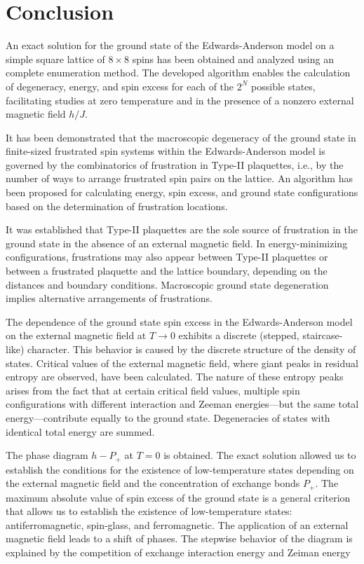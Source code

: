 \documentclass[preprint,12pt]{elsarticle}
\begin{document}
	\section{Conclusion}
	
	An exact solution for the ground state of the Edwards-Anderson model on a simple square lattice of $8 \times 8$ spins has been obtained and analyzed using an complete enumeration method. The developed algorithm enables the calculation of degeneracy, energy, and spin excess for each of the $2^N$ possible states, facilitating studies at zero temperature and in the presence of a nonzero external magnetic field $h/J$.
	
	It has been demonstrated that the macroscopic degeneracy of the ground state in finite-sized frustrated spin systems within the Edwards-Anderson model is governed by the combinatorics of frustration in  Type-II plaquettes, i.e., by the number of ways to arrange frustrated spin pairs on the lattice. An algorithm has been proposed for calculating energy, spin excess, and ground state configurations based on the determination of frustration locations.
	
	It was established that Type-II plaquettes are the sole source of frustration in the ground state in the absence of an external magnetic field. In energy-minimizing configurations, frustrations may also appear between Type-II plaquettes or between a frustrated plaquette and the lattice boundary, depending on the distances and boundary conditions. Macroscopic ground state degeneration implies alternative arrangements of frustrations.
	
	The dependence of the ground state spin excess in the Edwards-Anderson model on the external magnetic field at $T \to 0$ exhibits a discrete (stepped, staircase-like) character. This behavior is caused by the discrete structure of the density of states. Critical values of the external magnetic field, where giant peaks in residual entropy are observed, have been calculated. The nature of these entropy peaks arises from the fact that at certain critical field values, multiple spin configurations with different interaction and Zeeman energies—but the same total energy—contribute equally to the ground state. Degeneracies of states with identical total energy are summed.
	
	The phase diagram $h - P_+$ at $T = 0$ is obtained. The exact solution allowed us to establish the conditions for the existence of low-temperature states depending on the external magnetic field and the concentration of exchange bonds $P_+$. The maximum absolute value of spin excess of the ground state is a general criterion that allows us to establish the existence of low-temperature states: antiferromagnetic, spin-glass, and ferromagnetic. The application of an external magnetic field leads to a shift of phases. The stepwise behavior of the diagram is explained by the competition of exchange interaction energy and Zeiman energy
	
\end{document}
